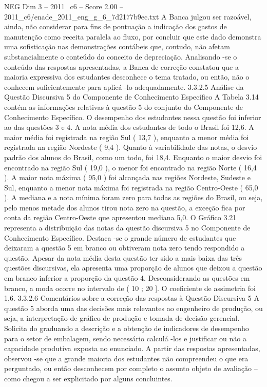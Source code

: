 \begin{textsample}{NEG Dim 3 – 2011\_c6 – Score 2.00 – 2011\_c6/enade\_2011\_eng\_g\_6\_7d2177b9ec.txt}
A Banca julgou ser razoável, ainda, não considerar para fins de pontuação a indicação dos gastos de manutenção como receita paralela ao fluxo, por concluir que este dado demonstra uma sofisticação nas demonstrações contábeis que, contudo, não afetam substancialmente o conteúdo do conceito de depreciação.
Analisando -se o conteúdo das respostas apresentadas, a Banca de correção constatou que a maioria expressiva dos estudantes desconhece o tema tratado, ou então, não o conhecem suficientemente para aplicá -lo adequadamente. 3.3.2.5 Análise da Questão Discursiva 5 do Componente de Conhecimento Específico A Tabela 3.14 contém as informações relativas à questão 5 do conjunto do Componente de Conhecimento Específico.
O desempenho dos estudantes nessa questão foi inferior ao das questões 3 e 4.
A nota média dos estudantes de todo o Brasil foi 12,6.
A maior média foi registrada na região Sul ( 13,7 ), enquanto a menor média foi registrada na região Nordeste ( 9,4 ).
Quanto à variabilidade das notas, o desvio padrão dos alunos do Brasil, como um todo, foi 18,4.
Enquanto o maior desvio foi encontrado na região Sul ( 19,0 ), o menor foi encontrado na região Norte ( 16,4 ).
A maior nota máxima ( 95,0 ) foi alcançada nas regiões Nordeste, Sudeste e Sul, enquanto a menor nota máxima foi registrada na região Centro-Oeste ( 65,0 ).
A mediana e a nota mínima foram zero para todas as regiões do Brasil, ou seja, pelo menos metade dos alunos tirou nota zero na questão, a exceção fica por conta da região Centro-Oeste que apresentou mediana 5,0.
O Gráfico 3.21 representa a distribuição das notas da questão discursiva 5 no Componente de Conhecimento Específico.
Destaca -se o grande número de estudantes que deixaram a questão 5 em branco ou obtiveram nota zero tendo respondido a questão.
Apesar da nota média desta questão ter sido a mais baixa das três questões discursivas, ela apresenta uma proporção de alunos que deixou a questão em branco inferior a proporção da questão 4.
Desconsiderando as questões em branco, a moda ocorre no intervalo de ( 10 ; 20 ].
O coeficiente de assimetria foi 1,6. 3.3.2.6 Comentários sobre a correção das respostas à Questão Discursiva 5 A questão 5 aborda uma das decisões mais relevantes ao engenheiro de produção, ou seja, a interpretação de gráfico de produção e tomada de decisão gerencial.
Solicita do graduando a descrição e a obtenção de indicadores de desempenho para o setor de embalagem, sendo necessário calculá -los e justificar ou não a capacidade produtiva exposta no enunciado.
A partir das respostas apresentadas, observou -se que a grande maioria dos estudantes não compreendeu o que era perguntado, ou então desconhecem por completo o assunto objeto de avaliação – como chegou a ser explicitado por alguns concluintes.

\end{textsample}
